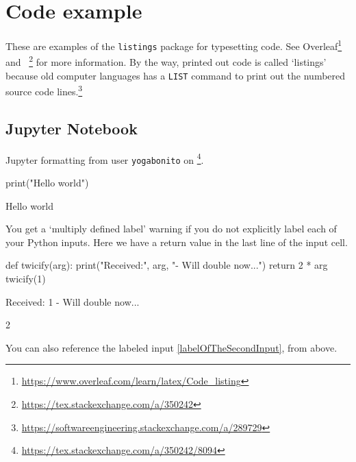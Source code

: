 
\section{Code example}

These are examples of the \texttt{listings} package for typesetting code. See Overleaf\footnote{\url{https://www.overleaf.com/learn/latex/Code_listing}} and ~\footnote{\url{https://tex.stackexchange.com/a/350242}} for more information. By the way, printed out code is called `listings' because old computer languages has a \texttt{LIST} command to print out the numbered source code lines.\footnote{\url{https://softwareengineering.stackexchange.com/a/289729}}

\subsection{Jupyter Notebook}

Jupyter formatting from user \texttt{yogabonito} on \footnote{\url{https://tex.stackexchange.com/a/350242/8094}}.

\begin{pyin}%
print("Hello world")
\end{pyin}
%  
\begin{pyprint}
Hello world
\end{pyprint}
% 
You get a `multiply defined label' warning if you do not explicitly label each of your Python inputs. 
% 
% 
Here we have a return value in the last line of the input cell.
\begin{pyin}[labelOfTheSecondInput]
def twicify(arg):
    print("Received:", arg, "- Will double now...")
    return 2 * arg
twicify(1)
\end{pyin}

\begin{pyprint}
Received: 1 - Will double now...
\end{pyprint}

\begin{pyout}
2
\end{pyout}
% 
You can also reference the labeled input \ref{labelOfTheSecondInput}, from above.


